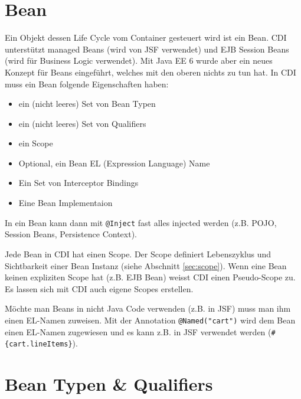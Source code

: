 \section{Bean}

Ein Objekt dessen Life Cycle vom Container gesteuert wird ist ein Bean. CDI unterstützt managed Beans (wird von JSF verwendet) und EJB Session Beans (wird für Business Logic verwendet). Mit Java EE 6 wurde aber ein neues Konzept für Beans eingeführt, welches mit den oberen nichts zu tun hat. In CDI muss ein Bean folgende Eigenschaften haben:
\begin{itemize}
	\item ein (nicht leeres) Set von Bean Typen
	\item ein (nicht leeres) Set von Qualifiers
	\item ein Scope
	\item Optional, ein Bean EL (Expression Language) Name
	\item Ein Set von Interceptor Bindings
	\item Eine Bean Implementaion
\end{itemize}
In ein Bean kann dann mit \verb|@Inject| fast alles injected werden (z.B. POJO, Session Beans, Persistence Context). 

Jede Bean in CDI hat einen Scope. Der Scope definiert Lebenszyklus und Sichtbarkeit einer Bean Instanz (siehe Abschnitt \ref{sec:scope}). Wenn eine Bean keinen expliziten Scope hat (z.B. EJB Bean) weisst CDI einen Pseudo-Scope zu. Es lassen sich mit CDI auch eigene Scopes erstellen.

Möchte man Beans in nicht Java Code verwenden (z.B. in JSF) muss man ihm einen EL-Namen zuweisen. Mit der Annotation \verb|@Named("cart")| wird dem Bean einen EL-Namen zugewiesen und es kann z.B. in JSF verwendet werden (\verb|#{cart.lineItems}|).

\section{Bean Typen \& Qualifiers}

